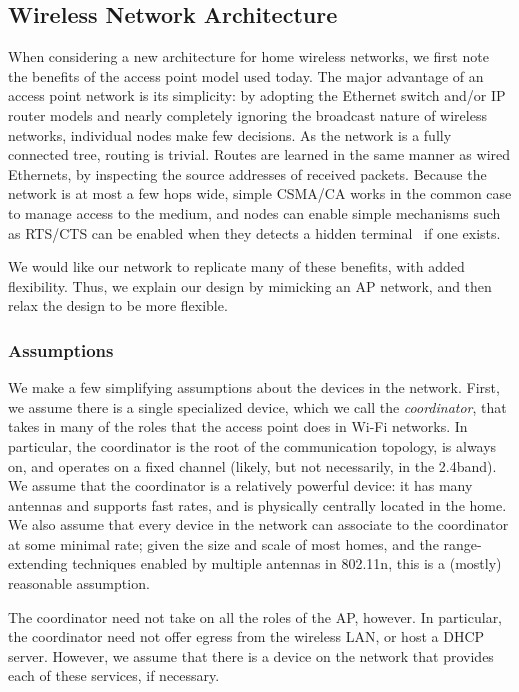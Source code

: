 \subsection{Wireless Network Architecture}
When considering a new architecture for home wireless networks, we first note the benefits of the access point model used today. The major advantage of an access point network is its simplicity: by adopting the Ethernet switch and/or IP router models and nearly completely ignoring the broadcast nature of wireless networks, individual nodes make few decisions. As the network is a fully connected tree, routing is trivial. Routes are learned in the same manner as wired Ethernets, by inspecting the source addresses of received packets. Because the network is at most a few hops wide, simple CSMA/CA works in the common case to manage access to the medium, and nodes can enable simple mechanisms such as RTS/CTS can be enabled when they detects a hidden terminal~\cite{wong_rraa} if one exists.

We would like our network to replicate many of these benefits, with added flexibility. Thus, we explain our design by mimicking an AP network, and then relax the design to be more flexible.

\subsubsection{Assumptions}
We make a few simplifying assumptions about the devices in the network. First, we assume there is a single specialized device, which we call the \emph{coordinator}, that takes in many of the roles that the access point does in Wi-Fi networks. In particular, the coordinator is the root of the communication topology, is always on, and operates on a fixed channel (likely, but not necessarily, in the 2.4\GHz band). We assume that the coordinator is a relatively powerful device: it has many antennas and supports fast rates, and is physically centrally located in the home. We also assume that every device in the network can associate to the coordinator at some minimal rate; given the size and scale of most homes, and the range-extending techniques enabled by multiple antennas in 802.11n, this is a (mostly) reasonable assumption.

The coordinator need not take on all the roles of the AP, however. In particular, the coordinator need not offer egress from the wireless LAN, or host a DHCP server. However, we assume that there is a device on the network that provides each of these services, if necessary.

